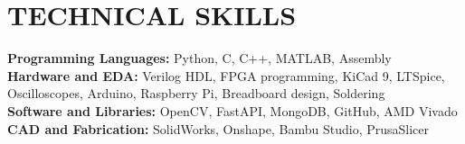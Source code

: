 \documentclass[letterpaper,11pt]{article}
\begin{document}
\section{TECHNICAL SKILLS}
 \begin{itemize}[leftmargin=0.15in, label={}]
    \small{\item{
     \textbf{Programming Languages:} Python, C, C++, MATLAB, Assembly \\
     \textbf{Hardware and EDA:} Verilog HDL, FPGA programming, KiCad 9, LTSpice, Oscilloscopes, Arduino, Raspberry Pi, Breadboard design, Soldering \\
     \textbf{Software and Libraries:} OpenCV, FastAPI, MongoDB, GitHub, AMD Vivado \\
     \textbf{CAD and Fabrication:} SolidWorks, Onshape, Bambu Studio, PrusaSlicer
    }}
 \end{itemize}


\end{document}

